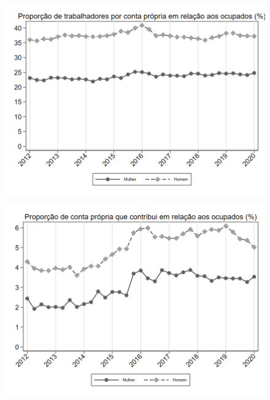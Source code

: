\begin{frame}[label=_composicao_demografica_genero_prop_cpropria]{}
\textit{\hyperlink{_composicao_demografica_genero}{}}
\begin{figure}
  \centering
  \includegraphics[width=1.0\linewidth]{../../analysis/output/composicao_demografica/genero/_composicao_demografica_genero_prop_cpropria.png}
  \caption{}
  \label{fig:_composicao_demografica_genero_prop_cpropria}
\end{figure}
\end{frame}

\begin{frame}[label=_composicao_demografica_genero_prop_cpropriaC]{}
\textit{\hyperlink{_composicao_demografica_genero}{}}
\begin{figure}
  \centering
  \includegraphics[width=1.0\linewidth]{../../analysis/output/composicao_demografica/genero/_composicao_demografica_genero_prop_cpropriaC.png}
  \caption{}
  \label{fig:_composicao_demografica_genero_prop_cpropriaC}
\end{figure}
\end{frame}


